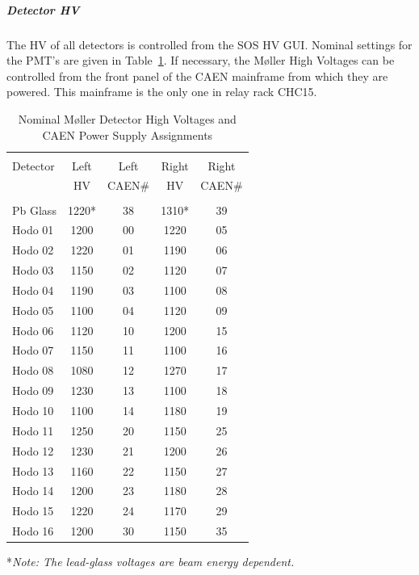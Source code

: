 \subparagraph{Detector HV}
The HV of all detectors is controlled from the SOS HV
GUI. Nominal settings for the PMT's are given in Table~\ref{tab:mol_hv}.
If necessary, the M\o ller High Voltages can be controlled from the front panel
of the CAEN mainframe from which they are powered. This mainframe is the only
one in relay rack CHC15.
\begin{table}
\begin{center}
\caption{Nominal M\o ller Detector High Voltages and CAEN Power Supply Assignments\label{tab:mol_hv}}
\vspace{\baselineskip}
\begin{tabular}{|l|c|c|c|c|}
\hline
{}         & {}   & {}    & {}    & {}    \\
Detector   & Left & Left  & Right & Right \\
           & HV   & CAEN$\#$ & HV    & CAEN$\#$ \\
{}         & {}   & {}    & {}    & {}    \\ \hline
Pb Glass   & 1220* & 38   & 1310* & 39    \\
Hodo 01    & 1200  & 00   & 1220  & 05    \\
Hodo 02    & 1220  & 01   & 1190  & 06    \\
Hodo 03    & 1150  & 02   & 1120  & 07    \\
Hodo 04    & 1190  & 03   & 1100  & 08    \\
Hodo 05    & 1100  & 04   & 1120  & 09    \\
Hodo 06    & 1120  & 10   & 1200  & 15    \\
Hodo 07    & 1150  & 11   & 1100  & 16    \\
Hodo 08    & 1080  & 12   & 1270  & 17    \\
Hodo 09    & 1230  & 13   & 1100  & 18    \\
Hodo 10    & 1100  & 14   & 1180  & 19    \\
Hodo 11    & 1250  & 20   & 1150  & 25    \\
Hodo 12    & 1230  & 21   & 1200  & 26    \\
Hodo 13    & 1160  & 22   & 1150  & 27    \\
Hodo 14    & 1200  & 23   & 1180  & 28    \\
Hodo 15    & 1220  & 24   & 1170  & 29    \\
Hodo 16    & 1200  & 30   & 1150  & 35    \\
\hline
\end{tabular}
\end{center}
\end{table}
*{\it Note: The lead-glass voltages are beam energy dependent.}

